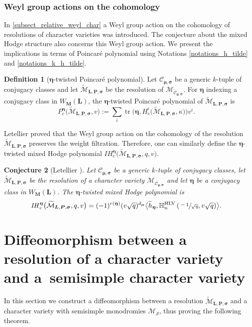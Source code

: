 \documentclass[JEP,XML,SOM,NoEqCountersInSection,Unicode,published]{cedram}
\newcommand{\rc}{\mathrm{c}}
\newcommand{\HLV}{\textup{HLV}}
\newcommand{\blangle}{\bigl\langle}
\newcommand{\brangle}{\bigr\rangle}
\theoremstyle{definition}
\newtheorem{definition}{Definition}[section]
\theoremstyle{plain}
\newtheorem{conjecture}[definition]{Conjecture}
\DeclareMathOperator{\tr}{tr}
\newcommand{\IH}{\mathit{IH}}
\newcommand{\mcmus}{\mathcal{M}_{\overline{\mathcal{C}}_{\boldsymbol{\mu},\boldsymbol{\sigma}}}}
\newcommand{\cmus}{\mathcal{C}_{\boldsymbol{\mu},\boldsymbol{\sigma}}}
\newcommand{\mlps}{\widetilde{\mathcal{M}}_{\boldsymbol{L},\boldsymbol{P},\boldsymbol{\sigma}}}
\begin{document}
\subsubsection{Weyl group actions on the cohomology}
In \ref{subsect_relative_weyl_char} a Weyl group action on the cohomology of resolutions of character varieties was introduced. The conjecture about the mixed Hodge structure also concerns this Weyl group action. We present the implications in terms of Poincaré polynomial using Notations \ref{notations_h_tilde} and \ref{notations_k_h_tilde}.
\begin{definition}[$\boldsymbol{\eta}$-twisted Poincaré polynomial]\label{def_twisted_Poincare}
Let $\mathcal{C}_{\boldsymbol{\mu},\boldsymbol{\sigma}}$ be a generic $k$-tuple of conjugacy classes and let $\mlps$ be the resolution of $\mcmus$. For $\boldsymbol{\eta}$ indexing a conjugacy class in $W_{\boldsymbol{M}}(\boldsymbol{L})$, the $\boldsymbol{\eta}$-twisted Poincaré polynomial of $\mlps$ is
\[
P_{\rc}^{\boldsymbol{\eta}}\bigl(\mlps,v\bigr) := \sum_{i} \tr\bigl(\boldsymbol{\eta}, H_\rc^i\bigl(\mlps, \kappa\bigr)\bigr)v^i.
\]
\end{definition}

Letellier proved that the Weyl group action on the cohomology of the resolution $\mlps$ preserves the weight filtration. Therefore, one can similarly define the $\boldsymbol{\eta}$\nobreakdash-twisted mixed Hodge polynomial $\IH_\rc^{\boldsymbol{\eta}}\bigl(\mlps,q,v\bigr)$.
\begin{conjecture}[Letellier {\cite[Conj.\,1.8]{Letellier13}}]\label{conj_twisted_mixed_resol}
Let $\cmus$ be a generic $k$-tuple of conjugacy classes, let $\mlps$ be the resolution of a character variety $\mcmus$ and let $\boldsymbol{\eta}$ be a conjugacy class in $W_{\boldsymbol{M}}(\boldsymbol{L})$. The $\boldsymbol{\eta}$-twisted mixed Hodge polynomial is
\[
\IH_\rc^{\boldsymbol{\eta}}\bigl(\mlps,q,v\bigr) = (-1)^{r(\boldsymbol{\eta})}(v\sqrt{q})^{d_{\boldsymbol{\mu}}} \blangle \widetilde{h}_{\boldsymbol{\eta}}, \mathbb{H}^{\HLV}_n \left(\sfrac{-1}{\sqrt{q}},v \sqrt{q}\right)\brangle.
\]

\end{conjecture}

\section{Diffeomorphism between a resolution of a character variety and a~semisimple character variety}\label{sect_diffeo_res}
In this section we construct a diffeomorphism between a resolution $\mlps$ and a character variety with semisimple monodromies $\mathcal{M}_{\boldsymbol{\mathcal{S}}}$, thus proving the following theorem.
\end{document}
